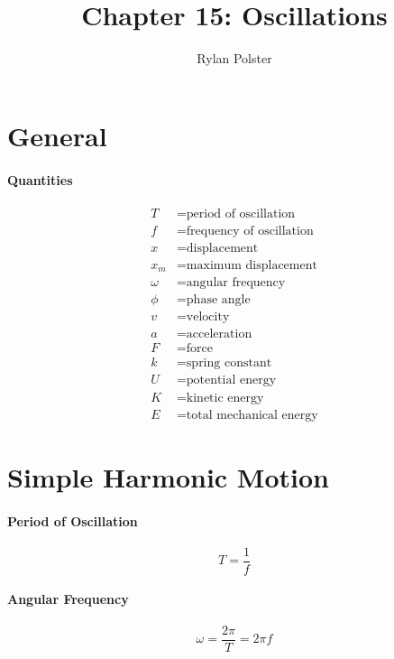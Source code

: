 \documentclass{article}
\title{Chapter 15: Oscillations}
\author{Rylan Polster}
\begin{document}
    \maketitle

    \section*{General}

        \paragraph{Quantities}
        \begin{align}
            T &= \text{period of oscillation} \nonumber\\
            f &= \text{frequency of oscillation} \nonumber\\
            x &= \text{displacement} \nonumber\\
            x_m &= \text{maximum displacement} \nonumber\\
            \omega &= \text{angular frequency} \nonumber\\
            \phi &= \text{phase angle} \nonumber\\
            v &= \text{velocity} \nonumber\\
            a &= \text{acceleration} \nonumber\\
            F &= \text{force} \nonumber\\
            k &= \text{spring constant} \nonumber\\
            U &= \text{potential energy} \nonumber\\
            K &= \text{kinetic energy} \nonumber\\
            E &= \text{total mechanical energy} \nonumber
        \end{align}

    \section{Simple Harmonic Motion}

        \paragraph{Period of Oscillation}
        \begin{equation}
            T = \frac{1}{f}
        \end{equation}

        \paragraph{Angular Frequency}
        \begin{equation}
            \omega = \frac{2 \pi}{T} = 2 \pi f
        \end{equation}
\end{document}

